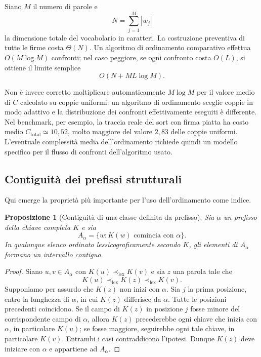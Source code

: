 \documentclass[11pt,a4paper]{article}
\newtheorem{proposizione}[teorema]{Proposizione}
\theoremstyle{definition}
\theoremstyle{remark}
\newcommand{\lexord}{\prec_{\mathrm{lex}}}
\begin{document}
Siano $M$ il numero di parole e
\[
  N=\sum_{j=1}^{M}|w_j|
\]
la dimensione totale del vocabolario in caratteri. La costruzione preventiva di tutte le firme costa $\Theta(N)$. Un algoritmo di ordinamento comparativo effettua $O(M\log M)$ confronti; nel caso peggiore, se ogni confronto costa $O(L)$, si ottiene il limite semplice
\[
  O(N+ML\log M).
\]

Non è invece corretto moltiplicare automaticamente $M\log M$ per il valore medio di $C$ calcolato su coppie uniformi: un algoritmo di ordinamento sceglie coppie in modo adattivo e la distribuzione dei confronti effettivamente eseguiti è differente. Nel benchmark, per esempio, la traccia reale del sort con firma piatta ha costo medio $C_{\mathrm{total}}\simeq10{,}52$, molto maggiore del valore $2{,}83$ delle coppie uniformi. L'eventuale complessità media dell'ordinamento richiede quindi un modello specifico per il flusso di confronti dell'algoritmo usato.

\subsection{Contiguità dei prefissi strutturali}

Qui emerge la proprietà più importante per l'uso dell'ordinamento come indice.

\begin{proposizione}[Contiguità di una classe definita da prefisso]
Sia $\alpha$ un prefisso della chiave completa $K$ e sia
\[
  A_{\alpha}=\{w:K(w)\text{ comincia con }\alpha\}.
\]
In qualunque elenco ordinato lessicograficamente secondo $K$, gli elementi di $A_{\alpha}$ formano un intervallo contiguo.
\end{proposizione}

\begin{proof}
Siano $u,v\in A_{\alpha}$ con $K(u)\lexord K(v)$ e sia $z$ una parola tale che
\[
  K(u)\lexord K(z)\lexord K(v).
\]
Supponiamo per assurdo che $K(z)$ non inizi con $\alpha$. Sia $j$ la prima posizione, entro la lunghezza di $\alpha$, in cui $K(z)$ differisce da $\alpha$. Tutte le posizioni precedenti coincidono. Se il campo di $K(z)$ in posizione $j$ fosse minore del corrispondente campo di $\alpha$, allora $K(z)$ precederebbe ogni chiave che inizia con $\alpha$, in particolare $K(u)$; se fosse maggiore, seguirebbe ogni tale chiave, in particolare $K(v)$. Entrambi i casi contraddicono l'ipotesi. Dunque $K(z)$ deve iniziare con $\alpha$ e appartiene ad $A_{\alpha}$.
\end{proof}
\end{document}
